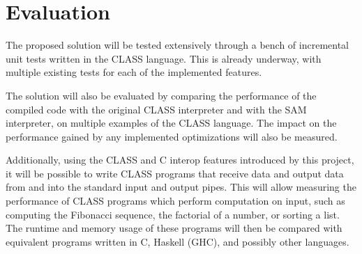 \section{Evaluation}

The proposed solution will be tested extensively through a bench of incremental unit tests written in the CLASS language. This is already underway, with multiple existing tests for each of the implemented features.

The solution will also be evaluated by comparing the performance of the compiled code with the original CLASS interpreter and with the SAM interpreter, on multiple examples of the CLASS language. The impact on the performance gained by any implemented optimizations will also be measured.

Additionally, using the CLASS and C interop features introduced by this project, it will be possible to write CLASS programs that receive data and output data from and into the standard input and output pipes. This will allow measuring the performance of CLASS programs which perform computation on input, such as computing the Fibonacci sequence, the factorial of a number, or sorting a list. The runtime and memory usage of these programs will then be compared with equivalent programs written in C, Haskell (GHC), and possibly other languages.
